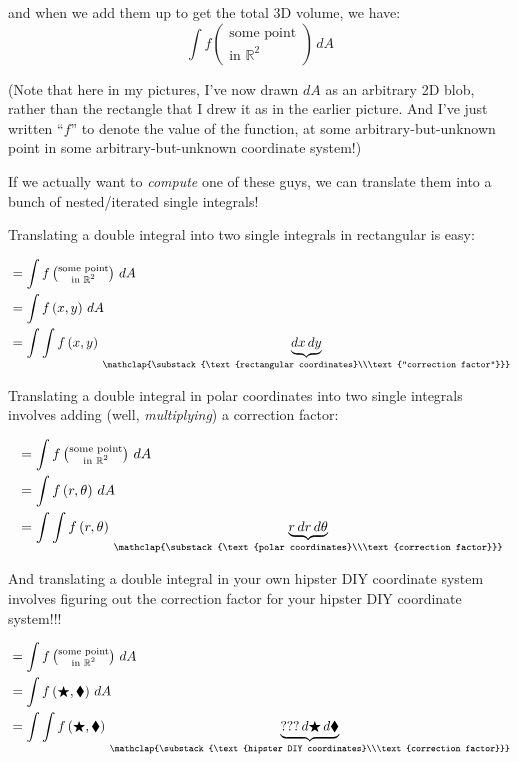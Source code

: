 \documentclass[
]{article}
\begin{document}
and when we add them up to get the total 3D volume, we have: \[ \int f\left(\substack{\text{some point}\\\text{in }\mathbb{R}^2}\right)\,dA \]

(Note that here in my pictures, I've now drawn \(dA\) as an arbitrary 2D blob, rather than the rectangle that I drew it as in the earlier picture. And I've just written ``\(f\)'' to denote the value of the function, at some arbitrary-but-unknown point in some arbitrary-but-unknown coordinate system!)

If we actually want to \emph{compute} one of these guys, we can translate them into a bunch of nested/iterated single integrals!

Translating a double integral into two single integrals in rectangular is easy:

\begin{align*}
&= \int f\left(\substack{\text{some point}\\\text{in }\mathbb{R}^2}\right)\,dA \\
&= \int f\left(x,y\right)\,dA \\
&= \int \int f\left(x,y\right)\,\underbrace{dx\, dy}_\mathclap{\substack{\text{rectangular coordinates}\\\text{``correction factor''}}}
\end{align*}

Translating a double integral in polar coordinates into two single integrals involves adding (well, \emph{multiplying}) a correction factor:

\begin{align*}
&= \int f\left(\substack{\text{some point}\\\text{in }\mathbb{R}^2}\right)\,dA \\
&= \int f\left(r,\theta\right)\,dA \\
&= \int \int f\left(r,\theta\right)\,\underbrace{r\, dr\, d\theta}_\mathclap{\substack{\text{polar coordinates}\\\text{correction factor}}}
\end{align*}

And translating a double integral in your own hipster DIY coordinate system involves figuring out the correction factor for your hipster DIY coordinate system!!!

\begin{align*}
&= \int f\left(\substack{\text{some point}\\\text{in }\mathbb{R}^2}\right)\,dA \\
&= \int f\left(\bigstar, \blacklozenge \right)\,dA \\
&= \int \int f\left(\bigstar, \blacklozenge \right)\,\underbrace{??? \, d\bigstar\, d\blacklozenge}_\mathclap{\substack{\text{hipster DIY coordinates}\\\text{correction factor}}} \\
\end{align*}
\end{document}
